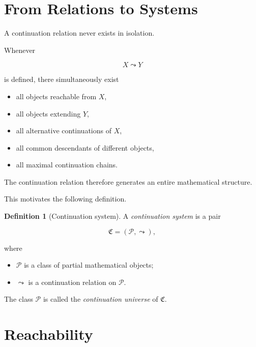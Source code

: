 \documentclass[13pt,openany]{book}
\theoremstyle{plain}
\theoremstyle{definition}
\newtheorem{definition}{Definition}[chapter]
\begin{document}
\section{From Relations to Systems}

A continuation relation never exists in isolation.

Whenever

\[
X\leadsto Y
\]

is defined, there simultaneously exist

\begin{itemize}
\item all objects reachable from \(X\),
\item all objects extending \(Y\),
\item all alternative continuations of \(X\),
\item all common descendants of different objects,
\item all maximal continuation chains.
\end{itemize}

The continuation relation therefore generates an entire mathematical
structure.

This motivates the following definition.

\begin{definition}[Continuation system]
A \emph{continuation system} is a pair

\[
\mathfrak C=(\mathcal P,\leadsto),
\]

where

\begin{itemize}

\item \(\mathcal P\) is a class of partial mathematical objects;

\item \(\leadsto\) is a continuation relation on \(\mathcal P\).

\end{itemize}

The class \(\mathcal P\) is called the \emph{continuation universe} of
\(\mathfrak C\).
\end{definition}

\section{Reachability}
\end{document}
